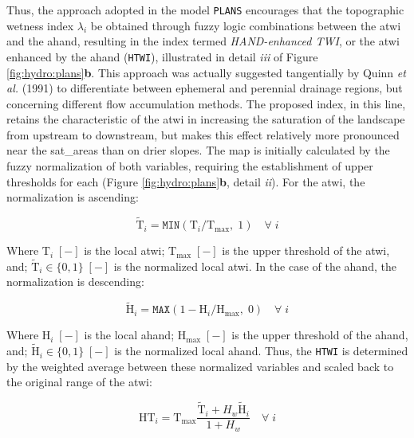 \documentclass[./main_en.tex]{subfiles}
\begin{document}
\par Thus, the approach adopted in the \gls{model} \texttt{PLANS} encourages that the topographic wetness index $\lambda_i$ be obtained through fuzzy logic combinations between the \acrshort{atwi} and the \acrshort{ahand}, resulting in the index termed \textit{HAND-enhanced TWI}, or the \acrshort{atwi} enhanced by the \acrshort{ahand} (\texttt{HTWI}), illustrated in detail \textit{iii} of Figure \ref{fig:hydro:plans}\textbf{b}. This approach was actually suggested tangentially by Quinn \textit{et al.} (1991) \cite{Quinn1991b} to differentiate between ephemeral and perennial drainage regions, but concerning different flow accumulation methods. The proposed index, in this line, retains the characteristic of the \acrshort{atwi} in increasing the saturation of the landscape from upstream to downstream, but makes this effect relatively more pronounced near the \gls{sat_areas} than on drier slopes. The map is initially calculated by the fuzzy normalization of both variables, requiring the establishment of upper thresholds for each (Figure \ref{fig:hydro:plans}\textbf{b}, detail \textit{ii}). For the \acrshort{atwi}, the normalization is ascending:
\begin{linenomath*}
\begin{equation}
\label{eq:plans:ftwi}
\tilde{\text{T}}_i = \texttt{MIN}(\text{T}_i/\text{T}_\text{max},\; 1) \quad \forall \; i
\end{equation}
\end{linenomath*}
Where  $\text{T}_i\;[-]$ is the local \acrshort{atwi}; $\text{T}_\text{max}\;[-]$ is the upper threshold of the \acrshort{atwi}, and; $\tilde{\text{T}}_i\in \{0,1\}\;[-]$ is the normalized local \acrshort{atwi}. In the case of the \acrshort{ahand}, the normalization is descending:
\begin{linenomath*}
\begin{equation}
\label{eq:plans:ahand}
\tilde{\text{H}}_i = \texttt{MAX}(1 - \text{H}_i/\text{H}_\text{max},\; 0) \quad \forall \; i
\end{equation}
\end{linenomath*}
Where  $\text{H}_i\;[-]$ is the local \acrshort{ahand}; $\text{H}_\text{max}\;[-]$ is the upper threshold of the \acrshort{ahand}, and; $\tilde{\text{H}}_i\in \{0,1\}\;[-]$ is the normalized local \acrshort{ahand}. Thus, the \texttt{HTWI} is determined by the weighted average between these normalized variables and scaled back to the original range of the \acrshort{atwi}:
\begin{linenomath*}
\begin{equation}
\label{eq:plans:htwi}
\text{HT}_{i} = \text{T}_\text{max} \frac{\tilde{\text{T}}_i + H_w \tilde{\text{H}}_i}{1 + H_w} \quad \forall \; i
\end{equation}
\end{linenomath*}
\end{document}
